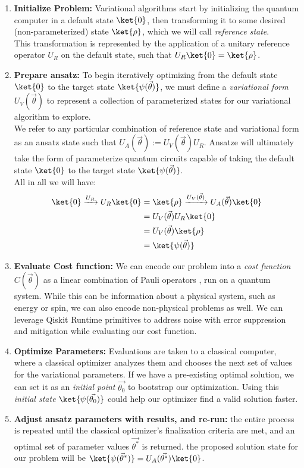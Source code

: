 \documentclass[12pt, oneside]{book}
\theoremstyle{definition}
\theoremstyle{definition}
\theoremstyle{remark}
\begin{document}
\begin{enumerate}
    \item \textbf{Initialize Problem: }Variational algorithms start by initializing the quantum computer in a default state $\ket{0}$, then transforming it to some desired (non-parameterized) state $\ket{\rho}$, which we will call \textit{reference state}.\\
    This transformation is represented by the application of a unitary reference operator $U_R$ on the default state, such that $U_R\ket{0}=\ket{\rho}$.
    \item \textbf{Prepare ansatz: }To begin iteratively optimizing from the default state $\ket{0}$ to the target state $\ket{\psi(\vec{\theta})}$, we must define a \textit{variational form} $U_V(\vec{\theta})$ to represent a collection of parameterized states for our variational algorithm to explore.\\
    We refer to any particular combination of reference state and variational form as an ansatz state such that $U_A(\vec{\theta}):=U_V(\vec{\theta})U_R$. Ansatze will ultimately take the form of parameterize quantum circuits capable of taking the default state $\ket{0}$ to the target state $\ket{\psi(\vec{\theta})}$.\\
    All in all we will have:
    \begin{align*}
        \ket{0}\xrightarrow{U_R} U_R\ket{0}&=\ket{\rho}\xrightarrow{U_V(\vec{\theta})} U_A(\vec{\theta})\ket{0}\\
        &=U_V(\vec{\theta})U_R\ket{0}\\
        &=U_V(\vec{\theta})\ket{\rho}\\
        &=\ket{\psi(\vec{\theta})}
    \end{align*}
    \item \textbf{Evaluate Cost function: }We can encode our problem into a \textit{cost function} $C(\vec{\theta})$ as a linear combination of Pauli operators , run on a quantum system. While this can be information about a physical system, such as energy or spin, we can also encode non-physical problems as well. We can leverage Qiskit Runtime primitives to address noise with error suppression and mitigation while evaluating our cost function.
    \item \textbf{Optimize Parameters: }Evaluations are taken to a classical computer, where a classical optimizer analyzes them and chooses the next set of values for the variational parameters. If we have a pre-existing optimal solution, we can set it as an \textit{initial point} $\vec{\theta_0}$ to bootstrap our optimization. Using this \textit{initial state} $\ket{\psi(\vec{\theta_0})}$ could help our optimizer find a valid solution faster.
    \item \textbf{Adjust ansatz parameters with results, and re-run: }the entire process is repeated until the classical optimizer's finalization criteria are met, and an optimal set of parameter values $\vec{\theta^*}$ is returned. the proposed solution state for our problem will be $\ket{\psi(\vec{\theta}^*)}=U_A(\vec{\theta^*})\ket{0}$.
\end{enumerate}
\end{document}
